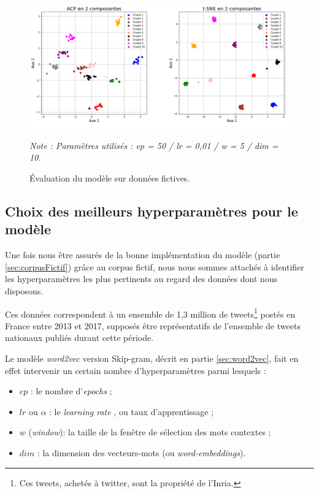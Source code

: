 \documentclass[11pt,french,french]{article}
\let\rmarkdownfootnote\footnote%
\def\footnote{\protect\rmarkdownfootnote}
\begin{document}
\begin{figure}
\begin{center}
\includegraphics[width=1\textwidth]{img/figures.png}
\captionsetup{margin=0cm,format=hang,justification=justified}
\caption{Évaluation du modèle sur données fictives.}\label{fig:figure_evaluation}
\end{center}
\vspace{-0.3cm}
\footnotesize
\emph{Note : Paramètres utilisés : ep = 50 / lr = 0,01 / w = 5 / dim = 10.}
\end{figure}

\hypertarget{sec:hyperparametres}{%
\subsection{Choix des meilleurs hyperparamètres pour le modèle}\label{sec:hyperparametres}}

Une fois nous être assurés de la bonne implémentation du modèle (partie \ref{sec:corpusFictif}) grâce au corpus fictif, nous nous sommes attachés à identifier les hyperparamètres les plus pertinents au regard des données dont nous disposons.

Ces données correspondent à un ensemble de 1,3 million de tweets\footnote{Ces tweets, achetés à twitter, sont la propriété de l'Inria.}
postés en France entre 2013 et 2017, supposés être représentatifs de l'ensemble de tweets nationaux publiés durant cette période.

Le modèle \emph{word2vec} version Skip-gram, décrit en partie \ref{sec:word2vec}, fait en effet intervenir un certain nombre d'hyperparamètres parmi lesquels :

\begin{itemize}
\item $ep$ : le nombre d'\og \emph{epochs} \fg{} ;
\item $lr$ ou $\alpha$ : le \og \emph{learning rate} \fg, ou taux d'apprentissage ;
\item $w$ (\emph{window}): la taille de la fenêtre de sélection des mots contextes ;
\item $dim$ : la dimension des vecteurs-mots (ou \emph{word-embeddings}).
\end{itemize}
\end{document}
